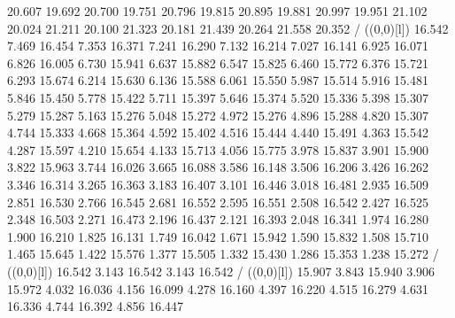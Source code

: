 {        20.607 19.692
        20.700 19.751
        20.796 19.815
        20.895 19.881
        20.997 19.951
        21.102 20.024
        21.211 20.100
        21.323 20.181
        21.439 20.264
        21.558 20.352
        /
\linethickness=1pt
\setplotsymbol ({\makebox(0,0)[l]{\tencirc{}}})
%
%
 16.542      7.469 16.454
         7.353 16.371
         7.241 16.290
         7.132 16.214
         7.027 16.141
         6.925 16.071
         6.826 16.005
         6.730 15.941
         6.637 15.882
         6.547 15.825
         6.460 15.772
         6.376 15.721
         6.293 15.674
         6.214 15.630
         6.136 15.588
         6.061 15.550
         5.987 15.514
         5.916 15.481
         5.846 15.450
         5.778 15.422
         5.711 15.397
         5.646 15.374
         5.520 15.336
         5.398 15.307
         5.279 15.287
         5.163 15.276
         5.048 15.272
         4.972 15.276
         4.896 15.288
         4.820 15.307
         4.744 15.333
         4.668 15.364
         4.592 15.402
         4.516 15.444
         4.440 15.491
         4.363 15.542
         4.287 15.597
         4.210 15.654
         4.133 15.713
         4.056 15.775
         3.978 15.837
         3.901 15.900
         3.822 15.963
         3.744 16.026
         3.665 16.088
         3.586 16.148
         3.506 16.206
         3.426 16.262
         3.346 16.314
         3.265 16.363
         3.183 16.407
         3.101 16.446
         3.018 16.481
         2.935 16.509
         2.851 16.530
         2.766 16.545
         2.681 16.552
         2.595 16.551
         2.508 16.542
         2.427 16.525
         2.348 16.503
         2.271 16.473
         2.196 16.437
         2.121 16.393
         2.048 16.341
         1.974 16.280
         1.900 16.210
         1.825 16.131
         1.749 16.042
         1.671 15.942
         1.590 15.832
         1.508 15.710
         1.465 15.645
         1.422 15.576
         1.377 15.505
         1.332 15.430
         1.286 15.353
         1.238 15.272
        /
\linethickness=1pt
\setplotsymbol ({\makebox(0,0)[l]{\tencirc{}}})
%
%
 16.542      3.143 16.542
         3.143 16.542
        /
\linethickness=1pt
\setplotsymbol ({\makebox(0,0)[l]{\tencirc{}}})
%
%
 15.907      3.843 15.940
         3.906 15.972
         4.032 16.036
         4.156 16.099
         4.278 16.160
         4.397 16.220
         4.515 16.279
         4.631 16.336
         4.744 16.392
         4.856 16.447
}
